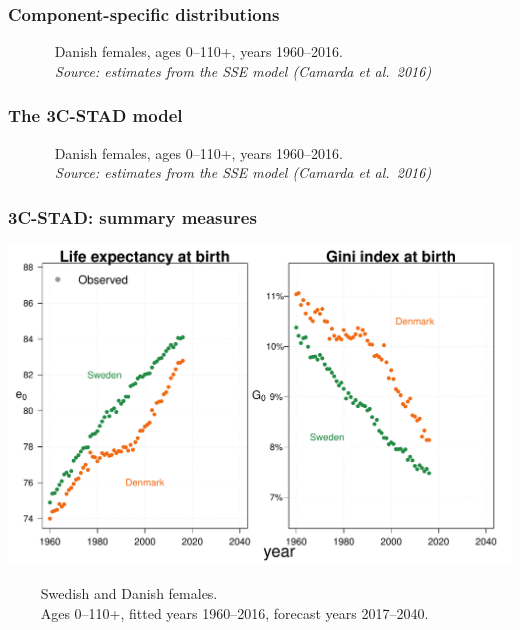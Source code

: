 \documentclass[12pt, xcolor=table]{beamer}  %
\begin{document}
\begin{frame}\frametitle{Component-specific distributions}
	\begin{center}
	\end{center}
	\vspace{-0.2cm}
	\tiny{$\quad\quad\quad$ Danish females, ages 0--110+, years 1960--2016. \\ \emph{$\quad\quad\quad$ Source: estimates from the SSE model (Camarda et al.~2016)}}
\end{frame}

\begin{frame}\frametitle{The 3C-STAD model}
	\begin{center}
	\end{center}
	\vspace{-0.2cm}
	\tiny{$\quad\quad\quad$ Danish females, ages 0--110+, years 1960--2016. \\ \emph{$\quad\quad\quad$ Source: estimates from the SSE model (Camarda et al.~2016)}}
\end{frame}

\begin{frame}\frametitle{3C-STAD: summary measures}

\vspace{-0.5cm}
	
	\begin{center}	
		\vspace{0.4cm}
		
		\includegraphics[scale=.42]{Figures/Ch3/F4_1}
		
	\end{center}
	
\vspace{-0.3cm}
\tiny{$\quad\quad$ Swedish and Danish females. \\ $\quad\quad$ Ages 0--110+, fitted years 1960--2016, forecast years 2017--2040.}	
	
\end{frame}
\end{document}
